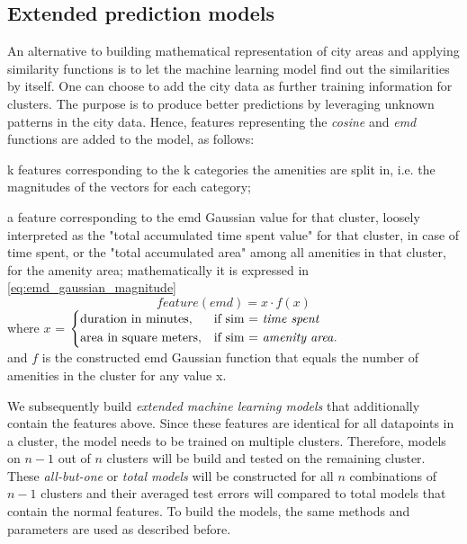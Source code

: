	\subsection{Extended prediction models}
	An alternative to building mathematical representation of city areas and applying similarity functions is to let the machine learning model find out the similarities by itself. 
	One can choose to add the city data as further training information for clusters. The purpose is to produce better predictions by leveraging unknown patterns in the city data. Hence, features representing the \textit{cosine} and \textit{emd} functions are added to the model, as follows: 
	\begin{romanlist}
		\item k features corresponding to the k categories the amenities are split in, i.e. the magnitudes of the vectors for each category;
		\item a feature corresponding to the emd Gaussian value for that cluster, loosely interpreted as the "total accumulated time spent value" for that cluster, in case of time spent, or the "total accumulated area" among all amenities in that cluster, for the amenity area; mathematically it is expressed in \cref{eq:emd_gaussian_magnitude}
		\begin{equation}
		feature(emd)=x \cdot f(x)
		\label{eq:emd_gaussian_magnitude}
		\end{equation}
		{\centering
			where $x$ = 
			$
			\begin{dcases}
			\text{duration in minutes}, & \text{if sim = \textit{time spent}} \\
			\text{area in square meters}, & \text{if sim = \textit{amenity area}}.
			\end{dcases}
			$ \\
			
			and $f$ is the constructed emd Gaussian function that equals the number of amenities in the cluster for any value x.}
	\end{romanlist}
	
	We subsequently build \textit{extended machine learning models} that additionally contain the features above. Since these features are identical for all datapoints in a cluster, the model needs to be trained on multiple clusters. Therefore, models on $n-1$ out of $n$ clusters will be build and tested on the remaining cluster. These \textit{all-but-one} or \textit{total models} will be constructed for all $n$ combinations of $n-1$ clusters and their averaged test errors will compared to total models that contain the normal features. To build the models, the same methods and parameters are used as described before.
	
